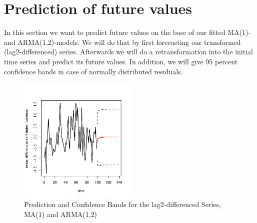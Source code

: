 \documentclass[11pt,a4paper]{article}
\begin{document}
\section{Prediction of future values}

In this section we want to predict future values on the base of our fitted MA(1)- and ARMA(1,2)-models.
We will do that by first forecasting our transformed (lag2-differenced) series.
Afterwards we will do a retransformation into the initial time series and predict its future values.
In addition, we will give 95 percent confidence bands in case of normally distributed residuals.

\begin{figure}
    \centering
    \includegraphics[width=0.5\textwidth]{pred_transformed_series}
    \caption{Prediction and Confidence Bands for the lag2-differenced Series, MA(1) and ARMA(1,2)}
    \label{fig:pred_transformed_series}
\end{figure}
\end{document}
